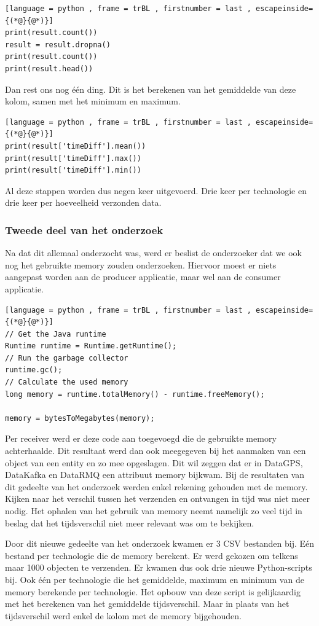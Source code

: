 \begin{lstlisting}[language = python , frame = trBL , firstnumber = last , escapeinside={(*@}{@*)}]
print(result.count())
result = result.dropna()
print(result.count())
print(result.head())
\end{lstlisting}

Dan rest ons nog één ding. Dit is het berekenen van het gemiddelde van deze kolom, samen met het minimum en maximum.
\begin{lstlisting}[language = python , frame = trBL , firstnumber = last , escapeinside={(*@}{@*)}]
print(result['timeDiff'].mean())
print(result['timeDiff'].max())
print(result['timeDiff'].min())
\end{lstlisting}
Al deze stappen worden dus negen keer uitgevoerd. Drie keer per technologie en drie keer per hoeveelheid verzonden data.

\subsubsection{Tweede deel van het onderzoek}
Na dat dit allemaal onderzocht was, werd er beslist de onderzoeker dat we ook nog het gebruikte memory zouden onderzoeken. Hiervoor moest er niets aangepast worden aan de producer applicatie, maar wel aan de consumer applicatie. 

\begin{lstlisting}[language = python , frame = trBL , firstnumber = last , escapeinside={(*@}{@*)}]
// Get the Java runtime
Runtime runtime = Runtime.getRuntime();
// Run the garbage collector
runtime.gc();
// Calculate the used memory
long memory = runtime.totalMemory() - runtime.freeMemory();

memory = bytesToMegabytes(memory);
\end{lstlisting}
Per receiver werd er deze code aan toegevoegd die de gebruikte memory achterhaalde. Dit resultaat werd dan ook meegegeven bij het aanmaken van een object van een entity en zo mee opgeslagen. Dit wil zeggen dat er in DataGPS, DataKafka en DataRMQ een attribuut memory bijkwam. Bij de resultaten van dit gedeelte van het onderzoek werden enkel rekening gehouden met de memory. Kijken naar het verschil tussen het verzenden en ontvangen in tijd was niet meer nodig. Het ophalen van het gebruik van memory neemt namelijk zo veel tijd in beslag dat het tijdsverschil niet meer relevant was om te bekijken.

Door dit nieuwe gedeelte van het onderzoek kwamen er 3 CSV bestanden bij. Eén bestand per technologie die de memory berekent. Er werd gekozen om telkens maar 1000 objecten te verzenden. Er kwamen dus ook drie nieuwe Python-scripts bij. Ook één per technologie die het gemiddelde, maximum en minimum van de memory berekende per technologie. Het opbouw van deze script is gelijkaardig met het berekenen van het gemiddelde tijdsverschil. Maar in plaats van het tijdsverschil werd enkel de kolom met de memory bijgehouden.  